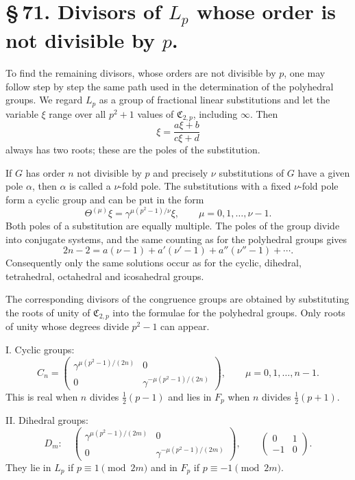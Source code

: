 \documentclass[11pt]{article}
\providecommand{\mat}[4]{\begin{pmatrix}#1&#2\\#3&#4\end{pmatrix}}
\providecommand{\mat}[4]{\begin{pmatrix}#1&#2\\#3&#4\end{pmatrix}}
\providecommand{\Cfield}{\mathfrak C}
\providecommand{\mat}[1]{\begin{pmatrix}#1\end{pmatrix}}
\begin{document}
\section*{\S\,71. Divisors of $L_p$ whose order is not divisible by $p$.}

To find the remaining divisors, whose orders are not divisible by $p$, one may follow step by step the same path used in the determination of the polyhedral groups. We regard $L_p$ as a group of fractional linear substitutions and let the variable $\xi$ range over all $p^2+1$ values of $\Cfield_{2,p}$, including $\infty$. Then
\begin{equation}
 \xi=\frac{a\xi+b}{c\xi+d}
 \tag{1}
\end{equation}
always has two roots; these are the poles of the substitution.

If $G$ has order $n$ not divisible by $p$ and precisely $\nu$ substitutions of $G$ have a given pole $\alpha$, then $\alpha$ is called a $\nu$-fold pole. The substitutions with a fixed $\nu$-fold pole form a cyclic group and can be put in the form
\begin{equation}
 \Theta^{(\mu)}\xi=\gamma^{\mu(p^2-1)/\nu}\xi,
 \qquad \mu=0,1,
 \ldots,\nu-1.
 \tag{2}
\end{equation}
Both poles of a substitution are equally multiple. The poles of the group divide into conjugate systems, and the same counting as for the polyhedral groups gives
\begin{equation}
 2n-2=a(\nu-1)+a'(\nu'-1)+a''(\nu''-1)+\cdots.
 \tag{3}
\end{equation}
Consequently only the same solutions occur as for the cyclic, dihedral, tetrahedral, octahedral and icosahedral groups.

The corresponding divisors of the congruence groups are obtained by substituting the roots of unity of $\Cfield_{2,p}$ into the formulae for the polyhedral groups. Only roots of unity whose degrees divide $p^2-1$ can appear.

I. Cyclic groups:
\begin{equation}
 C_n=\mat{\gamma^{\mu(p^2-1)/(2n)}}{0}{0}{\gamma^{-\mu(p^2-1)/(2n)}},
 \qquad \mu=0,1,\ldots,n-1.
 \tag{4}
\end{equation}
This is real when $n$ divides $\frac12(p-1)$ and lies in $F_p$ when $n$ divides $\frac12(p+1)$.

II. Dihedral groups:
\begin{equation}
 D_m:\quad
 \mat{\gamma^{\mu(p^2-1)/(2m)}}{0}{0}{\gamma^{-\mu(p^2-1)/(2m)}},
 \qquad
 \mat{0}{1}{-1}{0}.
 \tag{5}
\end{equation}
They lie in $L_p$ if $p\equiv1\pmod {2m}$ and in $F_p$ if $p\equiv-1\pmod {2m}$.
\end{document}

